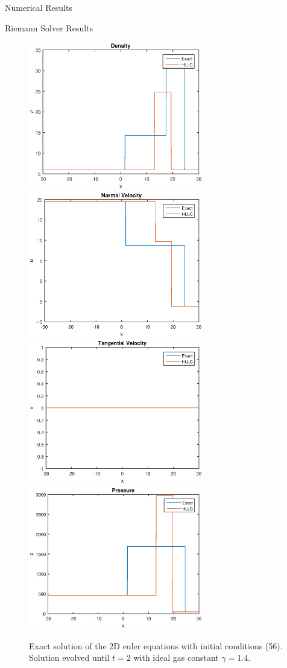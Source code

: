 \begin{section}{Numerical Results}
\begin{subsection}{Riemann Solver Results}
\begin{figure}[h]
\centering
\includegraphics[width=3in]{dubShockDen}
\includegraphics[width=3in]{dubShockU}\\
\includegraphics[width=3in]{dubShockV}
\includegraphics[width=3in]{dubShockP}
\caption{Exact solution of the 2D euler equations with initial conditions (56). Solution evolved until $t=2$ with ideal gas constant $\gamma=1.4$.}
\end{figure}


\end{subsection}
\end{section}
